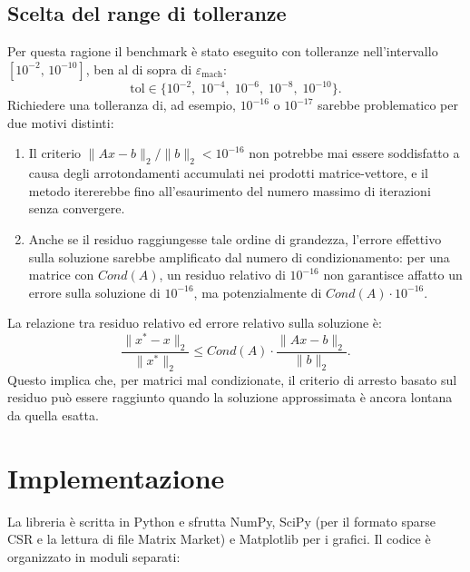 \documentclass[a4paper,12pt]{article}
\begin{document}
\subsection{Scelta del range di tolleranze}
Per questa ragione il benchmark è stato eseguito con tolleranze nell'intervallo $[10^{-2},\, 10^{-10}]$, ben al di sopra di $\varepsilon_{\text{mach}}$:
\begin{equation}
    \text{tol} \in \{10^{-2},\; 10^{-4},\; 10^{-6},\; 10^{-8},\; 10^{-10}\}.
\end{equation}
Richiedere una tolleranza di, ad esempio, $10^{-16}$ o $10^{-17}$ sarebbe problematico per due motivi distinti:
\begin{enumerate}
    \item Il criterio $\|Ax - b\|_2 / \|b\|_2 < 10^{-16}$ non potrebbe mai essere soddisfatto a causa degli arrotondamenti accumulati nei prodotti matrice-vettore, e il metodo itererebbe fino all'esaurimento del numero massimo di iterazioni senza convergere.
    \item Anche se il residuo raggiungesse tale ordine di grandezza, l'errore effettivo sulla soluzione sarebbe amplificato dal numero di condizionamento: per una matrice con $Cond(A)$, un residuo relativo di $10^{-16}$ non garantisce affatto un errore sulla soluzione di $10^{-16}$, ma potenzialmente di $Cond(A) \cdot 10^{-16}$.
\end{enumerate}
La relazione tra residuo relativo ed errore relativo sulla soluzione è:
\begin{equation}
    \frac{\|x^* - x\|_2}{\|x^*\|_2} \leq Cond(A) \cdot \frac{\|Ax - b\|_2}{\|b\|_2}.
\end{equation}
Questo implica che, per matrici mal condizionate, il criterio di arresto basato sul residuo può essere raggiunto quando la soluzione approssimata è ancora lontana da quella esatta.



\section{Implementazione}
\label{sec:impl}
La libreria è scritta in Python e sfrutta NumPy, SciPy (per il formato sparse CSR e la lettura di file Matrix Market) e Matplotlib per i grafici. Il codice è organizzato in moduli separati:
\end{document}
